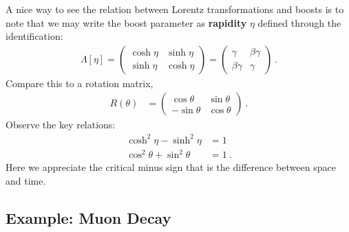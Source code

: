 \documentclass[12pt, oneside]{report}    %
\begin{document}
\begin{example}
A nice way to see the relation between Lorentz transformations and boosts is to note that we may write the boost parameter as \textbf{rapidity} $\eta$ defined through the identification:
\begin{align}
    \Lambda[\eta] = 
    \begin{pmatrix}
        \cosh \eta & \sinh \eta \\
        \sinh \eta & \cosh \eta
    \end{pmatrix}
    =
    \begin{pmatrix}
        \gamma & \beta\gamma \\
        \beta \gamma & \gamma
    \end{pmatrix} \ .
\end{align}
Compare this to a rotation matrix,
\begin{align}
    R(\theta) &=
    \begin{pmatrix}
        \cos \theta & \sin\theta \\
        -\sin \theta & \cos\theta
    \end{pmatrix} \ .
\end{align}
Observe the key relations:
\begin{align}
    \cosh^2 \eta - \sinh^2 \eta &= 1\\
    \cos^2 \theta + \sin^2 \theta &=1 \ .
\end{align}
Here we appreciate the critical minus sign that is the difference between space and time.
\end{example}

\subsection{Example: Muon Decay}
\end{document}
